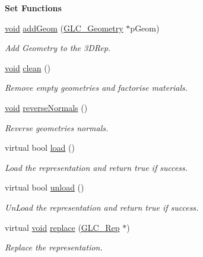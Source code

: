\begin{Indent}{\bf Set Functions}\par
\begin{DoxyCompactItemize}
\item 
\hyperlink{group___u_a_v_objects_plugin_ga444cf2ff3f0ecbe028adce838d373f5c}{void} \hyperlink{class_g_l_c__3_d_rep_aee2a5f0b7841d41ce5fd70aa6075ea50}{add\-Geom} (\hyperlink{class_g_l_c___geometry}{G\-L\-C\-\_\-\-Geometry} $\ast$p\-Geom)
\begin{DoxyCompactList}\small\item\em Add Geometry to the 3\-D\-Rep. \end{DoxyCompactList}\item 
\hyperlink{group___u_a_v_objects_plugin_ga444cf2ff3f0ecbe028adce838d373f5c}{void} \hyperlink{class_g_l_c__3_d_rep_a43e867093f86e1d440117d6b26706029}{clean} ()
\begin{DoxyCompactList}\small\item\em Remove empty geometries and factorise materials. \end{DoxyCompactList}\item 
\hyperlink{group___u_a_v_objects_plugin_ga444cf2ff3f0ecbe028adce838d373f5c}{void} \hyperlink{class_g_l_c__3_d_rep_ac6202b9b4e69b87e37c45148105a5b54}{reverse\-Normals} ()
\begin{DoxyCompactList}\small\item\em Reverse geometries normals. \end{DoxyCompactList}\item 
virtual bool \hyperlink{class_g_l_c__3_d_rep_ad71af8802feb16830a7ae528baec650f}{load} ()
\begin{DoxyCompactList}\small\item\em Load the representation and return true if success. \end{DoxyCompactList}\item 
virtual bool \hyperlink{class_g_l_c__3_d_rep_a7f1b9ea7dc3742aa37f396ddca3d6d38}{unload} ()
\begin{DoxyCompactList}\small\item\em Un\-Load the representation and return true if success. \end{DoxyCompactList}\item 
virtual \hyperlink{group___u_a_v_objects_plugin_ga444cf2ff3f0ecbe028adce838d373f5c}{void} \hyperlink{class_g_l_c__3_d_rep_a946e0aab973fcc7e68d107c45a1e4c22}{replace} (\hyperlink{class_g_l_c___rep}{G\-L\-C\-\_\-\-Rep} $\ast$)
\begin{DoxyCompactList}\small\item\em Replace the representation. \end{DoxyCompactList}\item 

\end{DoxyCompactItemize}
\end{Indent}
